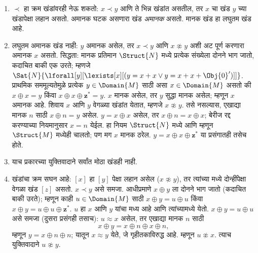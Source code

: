 \documentclass[../../../include/open-logic-section]{subfiles}
\begin{document}
\begin{enumerate}
  $x^* \prec y$. त्याचप्रमाणे $x \prec y$ आणि
  $x \not\approx y$ असतील, तर $x \prec {^*y}$.
  म्हणून $x \prec y$ आणि $x \not\approx y$ असतील,
  तर प्रत्येक $w \approx x$ हा प्रत्येक $v \approx y$
  पेक्षा $\prec$-लहान असतो. त्यानुसार, प्रत्येक
  अमानक खंड $[x]$ पुढील द्विदिश अनंत साखळी बनवतो:
  \[
  \cdots \prec  {^{**}x} \prec {^*}x \prec x \prec x^* \prec x^{**}
  \prec \cdots
  \]
  पूर्णांकांच्या क्रमप्रकारासारखा असल्यामुळे तिला
  $Z$-साखळी म्हणतात.
\item $\prec$ हा क्रम खंडांवरही नेऊ शकतो: $x \prec y$
  आणि ते भिन्न खंडांत असतील, तर $x$ चा खंड
  $y$ च्या खंडापेक्षा लहान असतो. अमानक घटक असणारा
  खंड \emph{अमानक} असतो. मानक खंड हा लघुतम खंड आहे.
\item लघुतम अमानक खंड नाही: $y$ अमानक असेल,
  तर $x \prec y$ आणि $x \not\approx y$ अशी अट
  पूर्ण करणारा अमानक $x$ असतो. सिद्धता: मानक
  प्रतिमान $\Struct{N}$ मध्ये प्रत्येक संख्येला दोनने
  भाग जातो, कदाचित बाकी एक उरते; म्हणजे
  $\Sat{N}{\lforall[y][\lexists[x][(y = x + x \lor y = x + x +
        \Obj{0}')]]}$. प्राथमिक सममूल्यतेमुळे
  प्रत्येक $y \in \Domain{M}$ साठी असा
  $x \in \Domain{M}$ असतो की $x \oplus x = y$
  किंवा $x \oplus x \oplus \mathbf{z}^*= y$.
  $x$ मानक असेल, तर $y$ सुद्धा मानक असेल;
  म्हणून $x$ अमानक आहे. शिवाय $x$ आणि $y$
  वेगळ्या खंडांत येतात, म्हणजे $x \not\approx y$.
  तसे नसल्यास, एखाद्या मानक $n$ साठी
  $x \oplus n = y$ असेल. $y = x \oplus x$
  असेल, तर $x \oplus n = x \oplus x$; बेरीज
  रद्द करण्याच्या नियमानुसार $x = n$ येईल.
  हा नियम $\Struct{N}$ मध्ये आणि म्हणून
  $\Struct{M}$ मध्येही चालतो; पण मग $x$
  मानक ठरेल. $y = x \oplus x \oplus \mathbf{z}^*$
  या प्रसंगातही तसेच होते.
\item याच प्रकारच्या युक्तिवादाने सर्वांत मोठा खंडही नाही.
\item खंडांचा क्रम सघन आहे: $[x]$ हा $[y]$
  पेक्षा लहान असेल ($x \not\approx y$), तर
  त्यांच्या मध्ये दोन्हींपेक्षा वेगळा खंड $[z]$
  असतो. $x \prec y$ असे समजा. आधीप्रमाणे
  $x \oplus y$ ला दोनने भाग जातो (कदाचित
  बाकी उरते); म्हणून काही $u \in \Domain{M}$
  साठी $x \oplus y = u \oplus u$ किंवा
  $x \oplus y = u \oplus u \oplus \mathbf{z}^*$.
  $u$ हा $x$ आणि $y$ यांचा मध्य आहे आणि
  त्यांच्यामध्ये येतो. $x \oplus y = u \oplus u$
  असे समजा (दुसरा प्रसंगही तसाच): $u \approx x$
  असेल, तर एखाद्या मानक $n$ साठी
  \[
  x \oplus y = x \oplus n \oplus x \oplus n,
  \]
  म्हणून $y = x \oplus n \oplus n$; यातून
  $x \approx y$ येते, जे गृहीतकाविरुद्ध आहे.
  म्हणून $u \not\approx x$. त्याच युक्तिवादाने
  $u \not\approx y$.
\end{enumerate}
\end{document}
